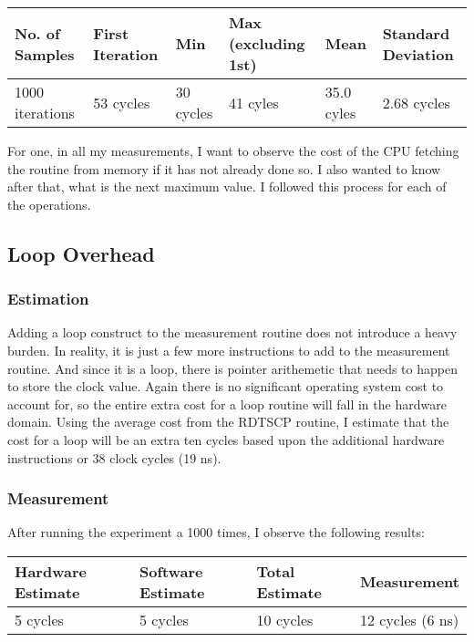 \documentclass[paper=a4, fontsize=11pt]{scrartcl}
\numberwithin{equation}{section}        %
\numberwithin{figure}{section}          %
\numberwithin{table}{section}               %
\begin{document}
\begin{center}
    \begin{tabular}{ | l | l | l | l | l | l |}
    \hline
    No. of Samples & First Iteration & Min & Max (excluding 1st) & Mean & Standard Deviation \\ \hline
    1000 iterations & 53 cycles & 30 cycles & 41 cyles & 35.0 cyles & 2.68 cycles \\ 
    \hline
    \end{tabular}
\end{center}

For one, in all my measurements, I want to observe the cost of the CPU fetching the routine from memory if it has not already done so.  I also wanted to know after that, what is the next maximum value.  I followed this process for each of the operations.

\subsection{Loop Overhead}

\subsubsection{Estimation}

Adding a loop construct to the measurement routine does not introduce a heavy burden.  In reality, it is just a few more instructions to add to the measurement routine.  And since it is a loop, there is pointer arithemetic that needs to happen to store the clock value.  Again there is no significant operating system cost to account for, so the entire extra cost for a loop routine will fall in the hardware domain.  Using the average cost from the RDTSCP routine, I estimate that the cost for a loop will be an extra ten cycles based upon the additional hardware instructions or 38 clock cycles (19 ns).

\subsubsection{Measurement}

After running the experiment a 1000 times, I observe the following results:

\begin{center}
    \begin{tabular}{ | l | l | l | l |}
    \hline
    Hardware Estimate & Software Estimate & Total Estimate & Measurement \\ \hline
    5 cycles & 5 cycles & 10 cycles & 12 cycles (6 ns) \\ 
    \hline
    \end{tabular}
\end{center}
\end{document}
